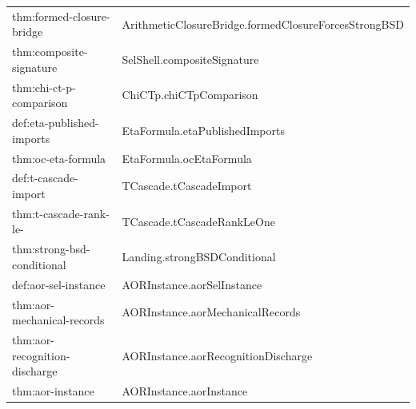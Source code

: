 \begin{small}
\begin{longtable}{@{}>{\ttfamily\raggedright\arraybackslash}p{} >{\ttfamily\raggedright\arraybackslash}p{}@{}}
thm:\allowbreak formed-\allowbreak closure-\allowbreak bridge & Arithmetic\allowbreak Closure\allowbreak Bridge.\allowbreak formed\allowbreak Closure\allowbreak Forces\allowbreak Strong\allowbreak BSD \\
thm:\allowbreak composite-\allowbreak signature & Sel\allowbreak Shell.\allowbreak composite\allowbreak Signature \\
thm:\allowbreak chi-\allowbreak ct-\allowbreak p-\allowbreak comparison & Chi\allowbreak CTp.\allowbreak chi\allowbreak CTp\allowbreak Comparison \\
def:\allowbreak eta-\allowbreak published-\allowbreak imports & Eta\allowbreak Formula.\allowbreak eta\allowbreak Published\allowbreak Imports \\
thm:\allowbreak oc-\allowbreak eta-\allowbreak formula & Eta\allowbreak Formula.\allowbreak oc\allowbreak Eta\allowbreak Formula \\
def:\allowbreak t-\allowbreak cascade-\allowbreak import & TCascade.\allowbreak t\allowbreak Cascade\allowbreak Import \\
thm:\allowbreak t-\allowbreak cascade-\allowbreak rank-\allowbreak le-\allowbreak 1 & TCascade.\allowbreak t\allowbreak Cascade\allowbreak Rank\allowbreak Le\allowbreak One \\
thm:\allowbreak strong-\allowbreak bsd-\allowbreak conditional & Landing.\allowbreak strong\allowbreak BSDConditional \\
def:\allowbreak aor-\allowbreak sel-\allowbreak instance & AORInstance.\allowbreak aor\allowbreak Sel\allowbreak Instance \\
thm:\allowbreak aor-\allowbreak mechanical-\allowbreak records & AORInstance.\allowbreak aor\allowbreak Mechanical\allowbreak Records \\
thm:\allowbreak aor-\allowbreak recognition-\allowbreak discharge & AORInstance.\allowbreak aor\allowbreak Recognition\allowbreak Discharge \\
thm:\allowbreak aor-\allowbreak instance & AORInstance.\allowbreak aor\allowbreak Instance \\
\end{longtable}
\end{small}
